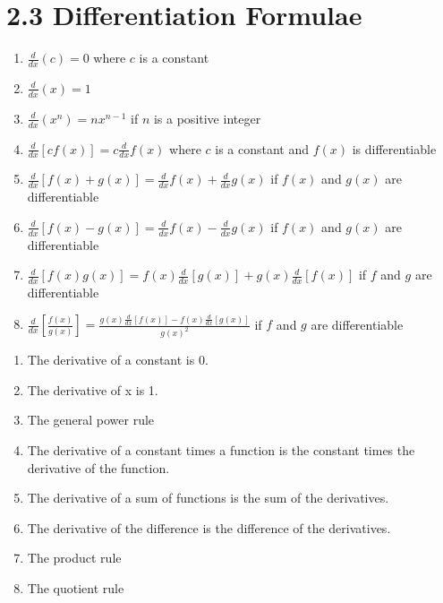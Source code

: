 %
%

\section*{2.3 Differentiation Formulae}

\begin{enumerate}
    \item \(\frac{d}{dx}(c)=0\) \quad where \(c\) is a constant
    \item \(\frac{d}{dx}(x)=1\)
    \item \(\frac{d}{dx}(x^n)=nx^{n-1}\) \quad if \(n\) is a positive integer
    \item \(\frac{d}{dx}[cf(x)]=c\frac{d}{dx}f(x)\) \quad where \(c\) is a constant and \(f(x)\) is differentiable
    \item \(\frac{d}{dx}[f(x)+g(x)]=\frac{d}{dx}f(x)+\frac{d}{dx}g(x)\) \quad if \(f(x)\) and \(g(x)\) are differentiable
    \item \(\frac{d}{dx}[f(x)-g(x)]=\frac{d}{dx}f(x)-\frac{d}{dx}g(x)\) \quad if \(f(x)\) and \(g(x)\) are differentiable
    \item \(\frac{d}{dx}[f(x)g(x)]=f(x)\frac{d}{dx}[g(x)]+g(x)\frac{d}{dx}[f(x)]\) \quad if \(f\) and \(g\) are differentiable
    \item \(\frac{d}{dx}[\frac{f(x)}{g(x)}]=\frac{g(x)\frac{d}{dx}[f(x)]-f(x)\frac{d}{dx}[g(x)]}{g{(x)}^2}\) \quad if \(f\) and \(g\) are differentiable
\end{enumerate}
\begin{enumerate}
    \item The derivative of a constant is 0.
    \item The derivative of x is 1.
    \item The general power rule
    \item The derivative of a constant times a function is the constant times the derivative of the function.
    \item The derivative of a sum of functions is the sum of the derivatives.
    \item The derivative of the difference is the difference of the derivatives.
    \item The product rule
    \item The quotient rule
\end{enumerate}

